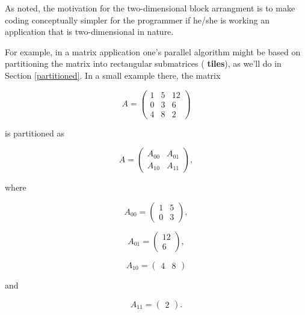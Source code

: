 As noted, the motivation for the two-dimensional block arrangment is to
make coding conceptually simpler for the programmer if he/she is working
an application that is two-dimensional in nature.  

For example, in a matrix application one's parallel algorithm might be
based on partitioning the matrix into rectangular submatrices ({\bf
tiles}), as we'll do in Section \ref{partitioned}.  In a small example
there, the matrix

\begin{equation}
A = 
\left (
\begin{array}{ccc}
1 & 5 & 12 \\
0 & 3 & 6 \\
4 & 8 & 2
\end{array}
\right )
\end{equation}

is partitioned as 

\begin{equation}
A =
\left (
\begin{array}{cc}
A_{00} & A_{01} \\
A_{10} & A_{11}
\end{array}
\right ) ,
\end{equation}

where

\begin{equation}
A_{00} =
\left (
\begin{array}{cc}
1 & 5 \\
0 & 3
\end{array}
\right )  ,
\end{equation}

\begin{equation}
A_{01} =
\left (
\begin{array}{cc}
12 \\
6 
\end{array}
\right ),
\end{equation}

\begin{equation}
A_{10} =
\left (
\begin{array}{cc}
4 & 8 
\end{array}
\right )  
\end{equation}

and

\begin{equation}
A_{11} =
\left (
\begin{array}{c}
2
\end{array}
\right ).
\end{equation}

